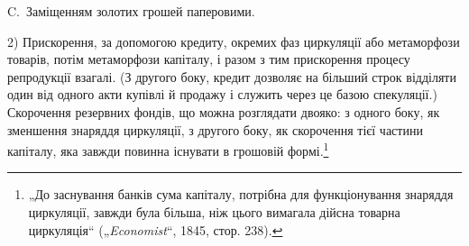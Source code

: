 C.~Заміщенням золотих грошей паперовими.

2) Прискорення, за допомогою кредиту, окремих фаз циркуляції
або метаморфози товарів, потім метаморфози капіталу, і разом
з тим прискорення процесу репродукції взагалі. (З другого боку,
кредит дозволяє на більший строк відділяти один від одного акти
купівлі й продажу і служить через це базою спекуляції.) Скорочення резервних фондів, що можна
розглядати двояко: з одного
боку, як зменшення знаряддя циркуляції, з другого боку, як скорочення тієї частини капіталу, яка
завжди повинна існувати в грошовій формі.\footnote{„До заснування банків сума капіталу, потрібна для функціонування знаряддя циркуляції, завжди була
більша, ніж цього вимагала дійсна товарна
циркуляція“ („\emph{Economist}“, 1845, стор. 238).}
